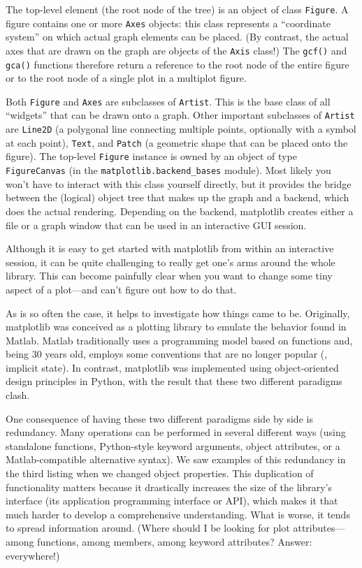 The top-level element (the root node of the tree) is an object of
class \texttt{Figure}. A figure contains one or more \texttt{Axes}
objects: this class represents a ``coordinate system'' on which actual
graph elements can be placed. (By contrast, the actual axes that are
drawn on the graph are objects of the \texttt{Axis} class!) The
\texttt{gcf()} and \texttt{gca()} functions therefore return a
reference to the root node of the entire figure or to the root node of
a single plot in a multiplot figure.

Both \texttt{Figure} and \texttt{Axes} are subclasses of
\texttt{Artist}.  This is the base class of all ``widgets'' that can
be drawn onto a graph. Other important subclasses of \texttt{Artist}
are \texttt{Line2D} (a polygonal line connecting multiple points,
optionally with a symbol at each point), \texttt{Text}, and
\texttt{Patch} (a geometric shape that can be placed onto the figure).
The top-level \texttt{Figure} instance is owned by an object of type
\texttt{FigureCanvas} (in the \texttt{matplotlib.backend\_bases}
module). Most likely you won't have to interact with this class
yourself directly, but it provides the bridge between the (logical)
object tree that makes up the graph and a backend, which does the
actual rendering. Depending on the backend, matplotlib creates either
a file or a graph window that can be used in an interactive GUI
session.


Although it is easy to get started with matplotlib from within an
interactive session, it can be quite challenging to really get one's
arms around the whole library. This can become painfully clear when
you want to change some tiny aspect of a plot---and can't figure out
how to do that. 

As is so often the case, it helps to investigate how things came to
be. Originally, matplotlib was conceived as a plotting library to
emulate the behavior found in Matlab. Matlab traditionally uses a
programming  model based on functions and, being 30 years old, employs
some conventions that are no longer popular (\ie, implicit state).  In
contrast, matplotlib was implemented using object-oriented design
principles in Python, with the result that these two different
paradigms clash.

One consequence of having these two different paradigms side by side
is redundancy.  Many operations can be performed in several different
ways (using standalone functions, Python-style keyword arguments,
object attributes,\vadjust{\pagebreak} or a Matlab-compatible alternative syntax). We saw
examples of this redundancy in the third listing when we changed
object properties. This duplication of functionality matters because
it drastically increases the size of the library's interface (its
application programming interface or API), which makes it that much
harder to develop a comprehensive understanding.  What is worse, it
tends to spread information around. (Where should I be looking for
plot attributes---among functions, among members, among keyword
attributes? Answer: everywhere!)

